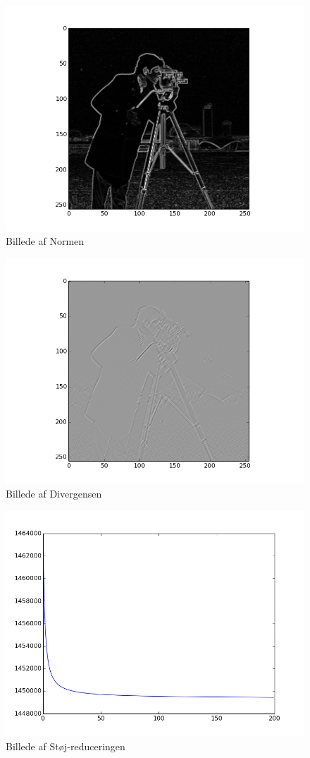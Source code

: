 \documentclass[12pt, a4paper]{article}
\begin{document}
\begin{figure}[H]
  \caption{Billede af Normen}
  \centering
	\includegraphics[scale=0.8]{norm}
\end{figure}
\begin{figure}[H]
  \caption{Billede af Divergensen}
  \centering
	\includegraphics[scale=0.8]{diver}
\end{figure}
\begin{figure}[H]
  \caption{Billede af Støj-reduceringen}
  \centering
	\includegraphics[scale=0.8]{energi}
\end{figure}
\end{document}
